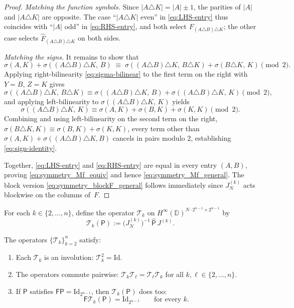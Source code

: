\documentclass[11pt]{amsart}
\begin{document}
\begin{proof}
\smallskip\noindent\emph{Matching the function symbols.}\;
Since $|A\triangle K|=|A|\pm 1$, the parities of $|A|$ and $|A\triangle K|$ are opposite. The case ``$|A\triangle K|$ even'' in \eqref{eq:LHS-entry} thus coincides with ``$|A|$ odd'' in \eqref{eq:RHS-entry}, and both select $F_{(A\triangle B)\triangle K}$; the other case selects $\hat F_{(A\triangle B)\triangle K}$ on both sides.

\smallskip\noindent\emph{Matching the signs.}\;
It remains to show that
\begin{equation}\label{eq:sign-identity}
\sigma(A,K)+\sigma((A\triangle B)\triangle K,\,B)
\;\equiv\;
\sigma((A\triangle B)\triangle K,\,B\triangle K)+\sigma(B\triangle K,\,K)\pmod 2.
\end{equation}
Applying right-bilinearity \eqref{eq:sigma-bilinear} to the first term on the right with $Y=B$, $Z=K$ gives
\[
\sigma((A\triangle B)\triangle K,\,B\triangle K)\equiv\sigma((A\triangle B)\triangle K,\,B)+\sigma((A\triangle B)\triangle K,\,K)\pmod 2,
\]
and applying left-bilinearity to $\sigma((A\triangle B)\triangle K,\,K)$ yields
\[
\sigma((A\triangle B)\triangle K,\,K)\equiv\sigma(A,K)+\sigma(B,K)+\sigma(K,K)\pmod 2.
\]
Combining and using left-bilinearity on the second term on the right, $\sigma(B\triangle K,K)\equiv\sigma(B,K)+\sigma(K,K)$, every term other than $\sigma(A,K)+\sigma((A\triangle B)\triangle K,B)$ cancels in pairs modulo $2$, establishing \eqref{eq:sign-identity}.

\smallskip
Together, \eqref{eq:LHS-entry} and \eqref{eq:RHS-entry} are equal in every entry $(A,B)$, proving \eqref{eq:symmetry_Mf_equiv} and hence \eqref{eq:symmetry_Mf_general}. The block version \eqref{eq:symmetry_blockF_general} follows immediately since $J_N^{(k)}$ acts blockwise on the columns of~$F$.
\end{proof}

For each $k \in \{2, \ldots, n\}$, define the operator $\mathcal T_k$ on $H^\infty(\mathbb{D})^{N\cdot 2^{n-1}\times 2^{n-1}}$ by
\begin{equation}\label{eq:Tk_def}
\mathcal T_k(\mathsf{P}) := \bigl(J_N^{(k)}\bigr)^{-1}\, \widehat{\mathsf{P}}\, J^{(k)}.
\end{equation}

\begin{prop}\label{prop:Tk_properties}
The operators $\{\mathcal T_k\}_{k=2}^n$ satisfy:
\begin{enumerate}
\item Each $\mathcal T_k$ is an involution: $\mathcal T_k^2 = \mathrm{Id}$.
\item The operators commute pairwise: $\mathcal T_k \mathcal T_\ell = \mathcal T_\ell \mathcal T_k$ for all $k, \ell \in \{2, \ldots, n\}$.
\item If $\mathsf{P}$ satisfies $\mathsf{F} \mathsf{P} = \mathrm{Id}_{2^{n-1}}$, then $\mathcal T_k(\mathsf{P})$ does too:
\[
\mathsf{F} \mathcal T_k(\mathsf{P}) = \mathrm{Id}_{2^{n-1}} \qquad \text{for every } k.
\]
\end{enumerate}
\end{prop}
\end{document}
